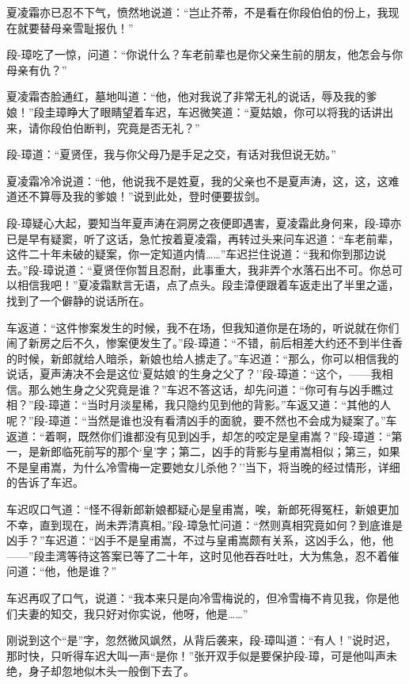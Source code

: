\documentclass[12pt,oneside]{book}
\begin{document}
夏凌霜亦已忍不下气，愤然地说道：``岂止芥蒂，不是看在你段伯伯的份上，我现在就要替母亲雪耻报仇！''

段-璋吃了一惊，问道：``你说什么？车老前辈也是你父亲生前的朋友，他怎会与你母亲有仇？''

夏凌霜杏脸通红，墓地叫道：``他，他对我说了非常无礼的说话，辱及我的爹娘！''段圭璋睁大了眼睛望着车迟，车迟微笑道：``夏姑娘，你可以将我的话讲出来，请你段伯伯断判，究竟是否无礼？''

段-璋道：``夏贤侄，我与你父母乃是手足之交，有话对我但说无妨。''

夏凌霜冷冷说道：``他，他说我不是姓夏，我的父亲也不是夏声涛，这，这，这难道还不算辱及我的爹娘！''说到此处，登时便要拔剑。

段-璋疑心大起，要知当年夏声涛在洞房之夜便即遇害，夏凌霜此身何来，段-璋亦已是早有疑窦，听了这话，急忙按着夏凌霜，再转过头来问车迟道：``车老前辈，这件二十年未破的疑案，你一定知道内情\ldots\ldots{}''车迟拦住说道：``我和你到那边说去。''段-璋说道：``夏贤侄你暂且忍耐，此事重大，我非弄个水落石出不可。你总可以相信我吧！''夏凌霜默言无语，点了点头。段圭漳便跟着车返走出了半里之遥，找到了一个僻静的说话所在。

车返道：``这件惨案发生的时候，我不在场，但我知道你是在场的，听说就在你们闹了新房之后不久，惨案便发生了。''段-璋道：``不错，前后相差大约还不到半住香的时候，新郎就给人暗杀，新娘也给人掳走了。''车迟道：``那么，你可以相信我的说话，夏声涛决不会是这位`夏姑娘'的生身之父了？''段-璋道：``这个，------我相信。那么她生身之父究竟是谁？''车迟不答这话，却先问道：``你可有与凶手瞧过相？''段-璋道：``当时月淡星稀，我只隐约见到他的背影。''车返又道：``其他的人呢？''段-璋道：``当然是谁也没有看清凶手的面貌，要不然也不会成为疑案了。''车返道：``着啊，既然你们谁都没有见到凶手，却怎的咬定是皇甫嵩？''段-璋道：``第一，是新郎临死前写的那个`皇'字；第二，凶手的背影与皇甫嵩相似；第三，如果不是皇甫嵩，为什么冷雪梅一定要她女儿杀他？''当下，将当晚的经过情形，详细的告诉了车迟。

车迟叹口气道：``怪不得新郎新娘都疑心是皇甫嵩，唉，新郎死得冤枉，新娘更加不幸，直到现在，尚未弄清真相。''段-璋急忙问道：``然则真相究竟如何？到底谁是凶手？''车迟道：``凶手不是皇甫嵩，不过与皇甫嵩颇有关系，这凶手么，他，他------''段圭湾等待这答案已等了二十年，这时见他吞吞吐吐，大为焦急，忍不着催问道：``他，他是谁？''

车迟再叹了口气，说道：``我本来只是向冷雪梅说的，但冷雪梅不肯见我，你是他们夫妻的知交，我只好对你实说，他呀，他是\ldots\ldots{}''

刚说到这个``是''字，忽然微风飒然，从背后袭来，段-璋叫道：``有人！''说时迟，那时快，只听得车迟大叫一声``是你！''张开双手似是要保护段-璋，可是他叫声未绝，身子却忽地似木头一般倒下去了。
\end{document}
